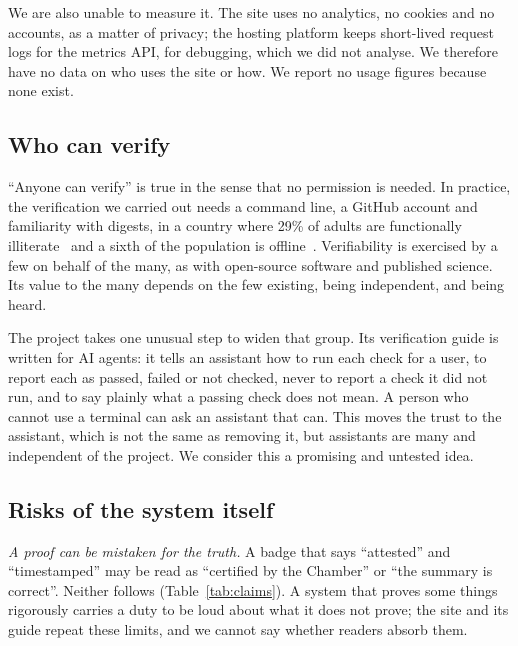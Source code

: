 We are also unable to measure it. The site uses no analytics, no cookies and no accounts, as a matter of privacy; the hosting platform keeps short-lived request logs for the metrics API, for debugging, which we did not analyse. We therefore have no data on who uses the site or how. We report no usage figures because none exist.

\subsection{Who can verify}
\label{sec:whoverifies}

``Anyone can verify'' is true in the sense that no permission is needed. In practice, the verification we carried out needs a command line, a GitHub account and familiarity with digests, in a country where 29\% of adults are functionally illiterate~\citep{inaf2024} and a sixth of the population is offline~\citep{carro2026brazil}. Verifiability is exercised by a few on behalf of the many, as with open-source software and published science. Its value to the many depends on the few existing, being independent, and being heard.

The project takes one unusual step to widen that group. Its verification guide is written for AI agents: it tells an assistant how to run each check for a user, to report each as passed, failed or not checked, never to report a check it did not run, and to say plainly what a passing check does not mean. A person who cannot use a terminal can ask an assistant that can. This moves the trust to the assistant, which is not the same as removing it, but assistants are many and independent of the project. We consider this a promising and untested idea.

\subsection{Risks of the system itself}
\label{sec:risks}

\emph{A proof can be mistaken for the truth.} A badge that says ``attested'' and ``timestamped'' may be read as ``certified by the Chamber'' or ``the summary is correct''. Neither follows (Table~\ref{tab:claims}). A system that proves some things rigorously carries a duty to be loud about what it does not prove; the site and its guide repeat these limits, and we cannot say whether readers absorb them.

